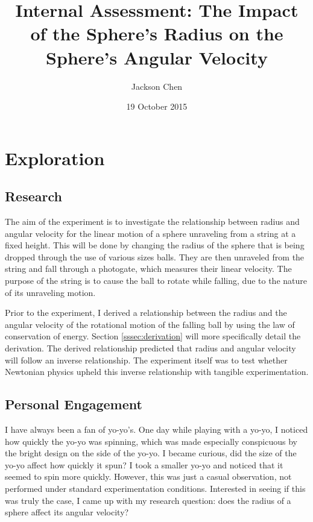 \documentclass[10pt, letterpaper]{article}
\newcommand{\subtitle}[1]{
  \posttitle{
    \par\end{center}
    \begin{center}\large#1\end{center}
    \vskip0.5em}
}
\begin{document}
  \title{Internal Assessment: The Impact of the Sphere's Radius on the Sphere's Angular Velocity}
  \subtitle {IB Physics II Period 6, Dr. Petach}
  \date{19 October 2015}
  \author{Jackson Chen}
  \maketitle

  \section{Exploration}

    \subsection{Research}

    The aim of the experiment is to investigate the relationship between radius and
    angular velocity for the linear motion of a sphere unraveling from a string at a
    fixed height. This will be done by changing the radius of the sphere that is being
    dropped through the use of various sizes balls. They are then unraveled from the string
    and fall through a photogate, which measures their linear velocity.
    The purpose of the string is to cause the ball to rotate while falling, due to the
    nature of its unraveling motion.

    Prior to the experiment, I derived a relationship between the radius and the angular
    velocity of the rotational motion of the falling ball by using the law of conservation of
    energy. Section \ref{sssec:derivation} will more specifically detail the derivation.
    The derived relationship predicted that radius and angular velocity will follow an inverse relationship.
    The experiment itself was to test whether Newtonian physics upheld this inverse
    relationship with tangible experimentation.

    \subsection{Personal Engagement}

    I have always been a fan of yo-yo's. One day while playing with a yo-yo, I noticed how
    quickly the yo-yo was spinning, which was made especially conspicuous by the bright design
    on the side of the yo-yo. I became curious, did the size of the yo-yo affect how quickly
    it spun? I took a smaller yo-yo and noticed that it seemed to spin more quickly.
    However, this was just a casual observation, not performed under standard experimentation
    conditions. Interested in seeing if this was truly the case, I came up with my research
    question: does the radius of a sphere affect its angular velocity?
\end{document}
